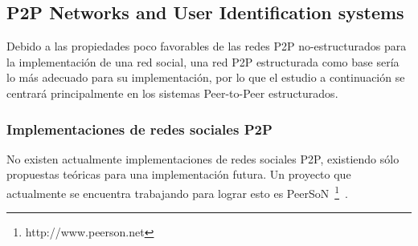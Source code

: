 %
%
%
%
%
%



\subsection{P2P Networks and User Identification systems}

Debido a las propiedades poco favorables de las redes P2P no-estructurados para la implementación de una red
social, una red P2P estructurada como base sería lo más adecuado para su
implementación, por lo que el estudio a continuación se centrará  principalmente
en los sistemas Peer-to-Peer estructurados.

\subsubsection{Implementaciones de redes sociales P2P}
No existen actualmente implementaciones de redes sociales P2P,
existiendo sólo propuestas teóricas para una implementación futura. Un proyecto
que actualmente se encuentra trabajando para lograr esto es
PeerSoN~\footnote{http://www.peerson.net}~\cite{buchegger:peerson, buchegger:2009:pps:1578002.1578010}.

